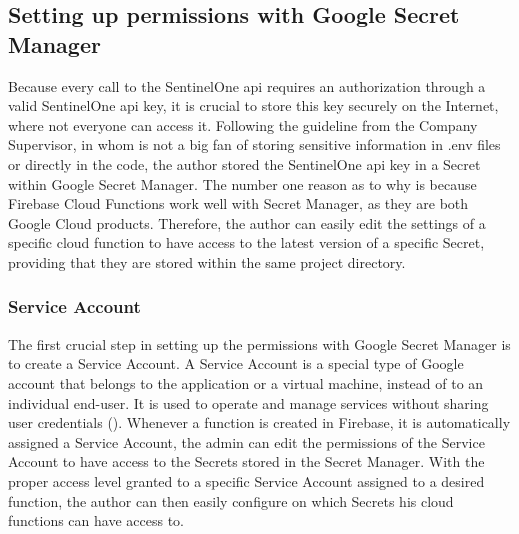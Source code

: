 \begin{multicols}{2}
      \subsection{Setting up permissions with Google Secret Manager}

      Because every call to the SentinelOne \acrshort{api} requires an authorization through a valid SentinelOne \acrshort{api} key, it is
      crucial to store this key securely on the Internet, where not everyone can access it. Following the guideline from the Company
      Supervisor, in whom is not a big fan of storing sensitive information in .env files or directly in the code, the author stored the
      SentinelOne \acrshort{api} key in a Secret within Google Secret Manager. The number one reason as to why is because Firebase Cloud
      Functions work well with Secret Manager, as they are both Google Cloud products. Therefore, the author can easily edit the settings of
      a specific cloud function to have access to the latest version of a specific Secret, providing that they are stored within the same
      project directory.

      \subsubsection{Service Account}

      The first crucial step in setting up the permissions with Google Secret Manager is to create a Service Account. A Service Account is
      a special type of Google account that belongs to the application or a virtual machine, instead of to an individual end-user. It is
      used to operate and manage services without sharing user credentials (\textit{\cite{serviceAccounts}}). Whenever a function is created
      in Firebase, it is automatically assigned a Service Account, the admin can edit the permissions of the Service Account to have access
      to the Secrets stored in the Secret Manager. With the proper access level granted to a specific Service Account assigned to a desired
      function, the author can then easily configure on which Secrets his cloud functions can have access to.


\end{multicols}
